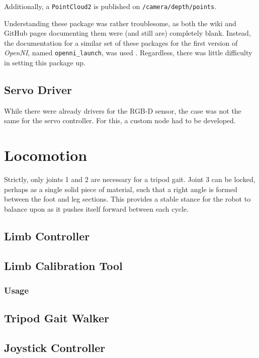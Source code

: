 Additionally, a \texttt{PointCloud2} is published on \texttt{/camera/depth/points}.

Understanding these package was rather troublesome, as both the wiki and GitHub pages documenting them were (and still are) completely blank. Instead, the documentation for a similar set of these packages for the first version of \emph{OpenNI}, named \texttt{openni\_launch}, was used \cite{ros_wiki_openni_launch}. Regardless, there was little difficulty in setting this package up.

\subsection{Servo Driver}

While there were already drivers for the RGB-D sensor, the case was not the same for the servo controller. For this, a custom node had to be developed.


\section{Locomotion}

Strictly, only joints 1 and 2 are necessary for a tripod gait. Joint 3 can be locked, perhaps as a single solid piece of material, such that a right angle is formed between the foot and leg sections. This provides a stable stance for the robot to balance upon as it pushes itself forward between each cycle.

\subsection{Limb Controller}
\subsection{Limb Calibration Tool}
\subsubsection{Usage}

\subsection{Tripod Gait Walker}
\subsection{Joystick Controller}

